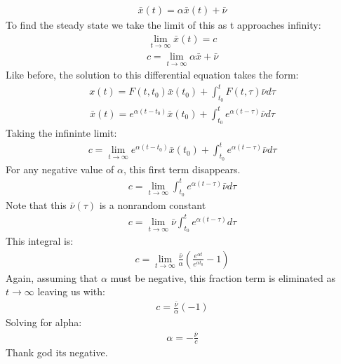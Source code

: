 \documentclass{article}
\begin{document}
\begin{align*}
\bar{x}(t) = \alpha \bar{x}(t) + \bar{\nu}
\end{align*}
To find the steady state we take the limit of this as t approaches infinity:
\begin{align*}
\lim_{t \rightarrow \infty} \bar{x}(t) = c
\end{align*}
\begin{align*}
c = \lim_{t \rightarrow \infty} \alpha \bar{x} + \bar{\nu}
\end{align*}
Like before, the solution to this differential equation takes the form:
\begin{align*}
x(t) = F(t,t_0)\bar{x}(t_0) + \int_{t_0}^{t} F(t,\tau) \bar{\nu}d\tau
\end{align*}
\begin{align*}
\bar{x}(t) = e^{\alpha (t-t_0)}\bar{x}(t_0) + \int_{t_0}^{t} e^{\alpha (t-\tau)} \bar{\nu} d\tau
\end{align*}
Taking the infininte limit:
\begin{align*}
c = \lim_{t \rightarrow \infty} e^{\alpha (t-t_0)}\bar{x}(t_0) + \int_{t_0}^{t} e^{\alpha (t-\tau)} \bar{\nu} d\tau
\end{align*}
For any negative value of $\alpha$, this first term disappears.
\begin{align*}
c = \lim_{t \rightarrow \infty} \int_{t_0}^{t} e^{\alpha (t-\tau)} \bar{\nu} d\tau
\end{align*}
Note that this $\bar{\nu}(\tau)$ is a nonrandom constant
\begin{align*}
c = \lim_{t \rightarrow \infty} \bar{\nu} \int_{t_0}^{t} e^{\alpha (t-\tau)} d\tau
\end{align*}
This integral is:
\begin{align*}
c = \lim_{t \rightarrow \infty} \frac{\bar{\nu}}{\alpha} (\frac{e^{\alpha t}}{e^{\alpha t_0}}- 1)
\end{align*}
Again, assuming that $\alpha$ must be negative, this fraction term is eliminated as $t\rightarrow \infty$ leaving us with:
\begin{align*}
c = \frac{\bar{\nu}}{\alpha} (-1)
\end{align*}
Solving for alpha:
\begin{align*}
\boxed{ \alpha = -\frac{\bar{\nu}}{c} }
\end{align*}
Thank god its negative.
\end{document}
